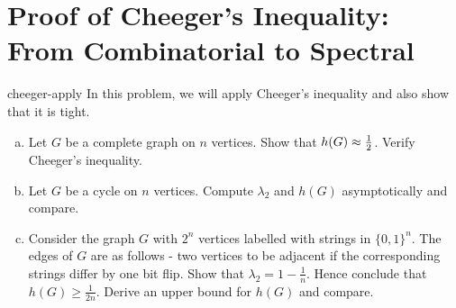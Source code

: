 \section{Proof of Cheeger's Inequality: From Combinatorial to Spectral}


\begin{exercise-prob}
\begin{show-ps3}{cheeger-apply}
In this problem, we will apply Cheeger's inequality and also show that it is tight.
\begin{enumerate}[(a)]
\item Let $G$ be a complete graph on $n$ vertices. Show that $h(G) \approx \frac{1}{2}$. Verify Cheeger's inequality.
\item Let $G$ be a cycle on $n$ vertices. Compute $\lambda_2$ and $h(G)$ asymptotically and compare.
\item Consider the graph $G$ with $2^n$ vertices labelled with strings in $\{0,1\}^n$. The edges of $G$ are as follows - two vertices to be adjacent if the corresponding strings differ by one bit flip. Show that $\lambda_2 = 1 - \frac{1}{n}$. Hence conclude that $h(G) \ge \frac{1}{2n}$. Derive an upper bound for $h(G)$ and compare.

\end{enumerate}

\end{show-ps3}
\end{exercise-prob}